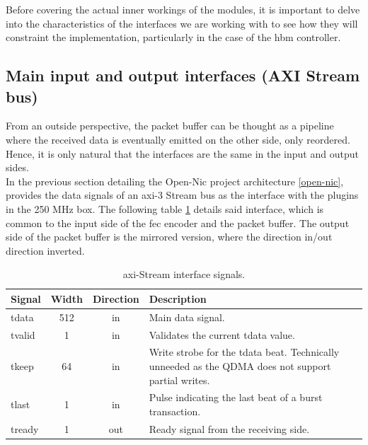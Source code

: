 Before covering the actual inner workings of the modules, it is important to delve into the characteristics 
of the interfaces we are working with to see how they will constraint the implementation, particularly 
in the case of the \gls{hbm} controller.

\subsection{Main input and output interfaces (AXI Stream bus)}\label{interface_definition}

From an outside perspective, the packet buffer can be thought as a pipeline where the received data is eventually
emitted on the other side, only reordered. Hence, it is only natural that the interfaces are the same in the input and
output sides.\\

In the previous section detailing the Open-Nic project architecture \ref{open-nic},
provides the data signals of an \gls{axi}-3 Stream bus as the interface with the plugins in the 250 MHz box.
The following table \ref{tab:axi_stream_signals} details said interface, 
which is common to the input side of the \gls{fec} encoder and the packet buffer. The output side of the packet buffer is the mirrored version,
where the direction in/out direction inverted.

\begin{table}[ht]
\centering
\begin{tabular}{lccp{8cm}}
\hline
\textbf{Signal} & \textbf{Width} & \textbf{Direction} & \textbf{Description} \\ \hline
tdata  & 512 & in  & Main data signal. \\
tvalid & 1   & in  & Validates the current tdata value. \\
tkeep  & 64  & in  & Write strobe for the tdata beat. Technically unneeded as the QDMA does not support partial writes. \\
tlast  & 1   & in  & Pulse indicating the last beat of a burst transaction. \\
tready & 1   & out & Ready signal from the receiving side. \\ \hline
\end{tabular}
\caption{\gls{axi}-Stream interface signals.}
\label{tab:axi_stream_signals}
\end{table}


